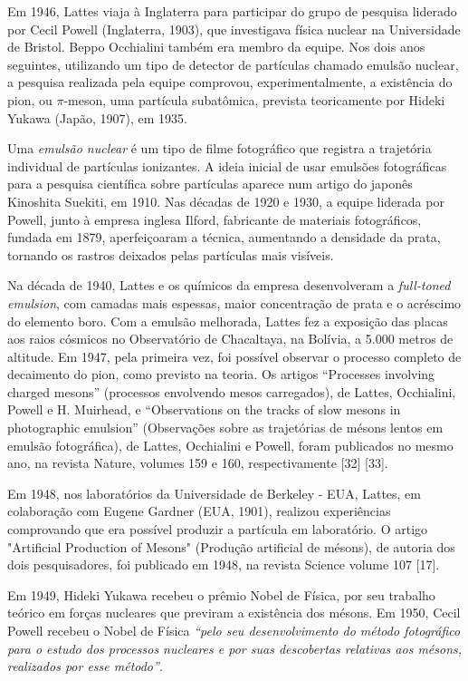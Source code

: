 \documentclass{hipatia}
\begin{document}
Em 1946, Lattes viaja à Inglaterra para participar do grupo de pesquisa liderado por Cecil Powell (Inglaterra, 1903), que investigava física nuclear na Universidade de Bristol. Beppo Occhialini também era membro da equipe. Nos dois anos seguintes, utilizando um tipo de detector de partículas chamado emulsão nuclear, a pesquisa realizada pela equipe comprovou, experimentalmente, a existência do pion, ou $\pi$-meson, uma partícula subatômica, prevista teoricamente por Hideki Yukawa (Japão, 1907), em 1935.

Uma \textit{emulsão nuclear} é um tipo de filme fotográfico que registra a trajetória individual de partículas ionizantes. A ideia inicial de usar emulsões fotográficas para a pesquisa científica sobre partículas aparece num artigo do japonês Kinoshita Suekiti, em 1910. Nas décadas de 1920 e 1930, a equipe liderada por Powell, junto à empresa inglesa Ilford, fabricante de materiais fotográficos, fundada em 1879, aperfeiçoaram a técnica, aumentando a densidade da prata, tornando os rastros deixados pelas partículas mais visíveis. 

Na década de 1940, Lattes e os químicos da empresa desenvolveram a \textit{full-toned emulsion}, com camadas mais espessas, maior concentração de prata e o acréscimo do elemento boro. Com a emulsão melhorada, Lattes fez a exposição das placas aos raios cósmicos no Observatório de Chacaltaya, na Bolívia, a 5.000 metros de altitude. Em 1947, pela primeira vez, foi possível observar o processo completo de decaimento do pion, como previsto na teoria. Os artigos ``Processes involving charged mesons'' (processos envolvendo mesos carregados), de Lattes, Occhialini, Powell e H. Muirhead, e  ``Observations on the tracks of slow mesons in photographic emulsion'' (Observações sobre as trajetórias de mésons lentos em emulsão fotográfica), de Lattes, Occhialini e Powell, foram publicados no mesmo ano, na revista Nature, volumes 159 e 160, respectivamente 	[32] 	[33].

Em 1948, nos laboratórios da Universidade de Berkeley - EUA, Lattes, em colaboração com Eugene Gardner (EUA, 1901), realizou experiências comprovando que era possível produzir a partícula em laboratório. O artigo "Artificial Production of Mesons" (Produção artificial de mésons), de autoria dos dois pesquisadores, foi publicado em 1948, na revista Science volume 107 [17].


Em 1949, Hideki Yukawa recebeu o prêmio Nobel de Física, por seu trabalho teórico em forças nucleares que previram a existência dos mésons. Em 1950, Cecil Powell recebeu o Nobel de Física \textit{``pelo seu desenvolvimento do método fotográfico para o estudo dos processos nucleares e por suas descobertas relativas aos mésons, realizados por esse método''}.
\end{document}
